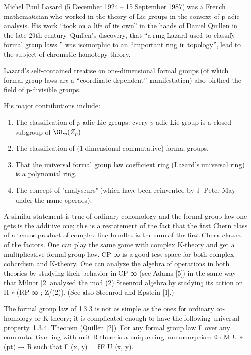 \documentclass{ccg-topic}
\author{ccg}
\date{\today}
\begin{document}
\frontstuff

\newcommand{\FGL}{\mathrm{FGL}} 

\begin{note}
    \label{rem:wikipedia_biography}
    Michel Paul Lazard (5 December 1924 – 15 September 1987) was a French mathematician who worked in the theory of Lie groups in the context of p-adic analysis. His work ``took on a life of its own'' in the hands of Daniel Quillen in the late 20th century. Quillen's discovery, that ``a ring Lazard used to classify formal group laws '' was isomorphic to an ``important ring in topology'', lead to the subject of chromatic homotopy theory.

Lazard's self-contained treatise on one-dimensional formal groups (of which formal group laws are a ``coordinate dependent'' manifestation) also birthed the field of p-divisible groups.

His major contributions include: 
\begin{enumerate}
\item The classification of $p$-adic Lie groups: every $p$-adic Lie group is a closed subgroup of $\GL_n(Z_p)$
\item The classification of (1-dimensional commutative) formal groups.
\item That the universal formal group law coefficient ring (Lazard's universal ring) is a polynomial ring.
\item The concept of "analyseurs" (which have been reinvented by J. Peter May under the name operads).
\end{enumerate}
\end{note}

A similar statement is true of ordinary cohomology and the formal group law
one gets is the additive one; this is a restatement of the fact that the first Chern
class of a tensor product of complex line bundles is the sum of the first Chern
classes of the factors. One can play the same game with complex K-theory and get
a multiplicative formal group law.
CP ∞ is a good test space for both complex cobordism and K-theory. One
can analyze the algebra of operations in both theories by studying their behavior
in CP ∞ (see Adams [5]) in the same way that Milnor [2] analyzed the mod (2)
Steenrod algebra by studying its action on H ∗ (RP ∞ ; Z/(2)). (See also Steenrod
and Epstein [1].)

The formal group law of 1.3.3 is not as simple as the ones for ordinary co-
homology or K-theory; it is complicated enough to have the following universal
property.
1.3.4. Theorem (Quillen [2]). For any formal group law F over any commuta-
tive ring with unit R there is a unique ring homomorphism θ : M U ∗ (pt) → R such
that F (x, y) = θF U (x, y).
\end{document}
